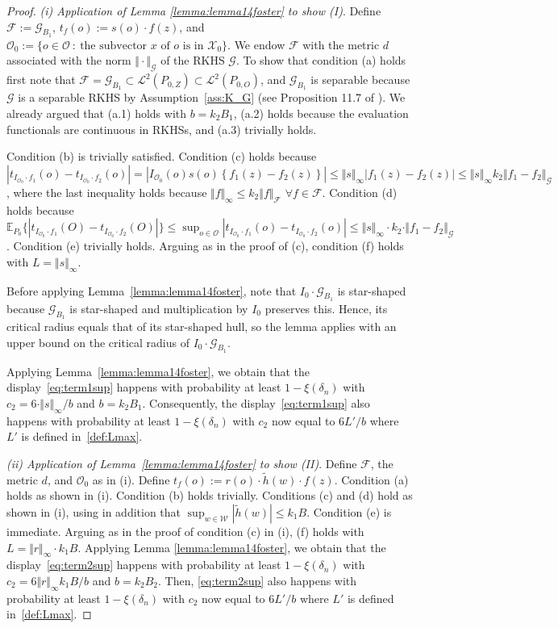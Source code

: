 \documentclass[twoside,11pt]{article}
\newcommand{\E}{\mathbb{E}}
\newcommand{\mc}{\mathcal}
\begin{document}
\begin{proof}
\textit{(i) Application of Lemma \ref{lemma:lemma14foster} to show (I)}. Define $\mc{F}:=\mc{G}_{B_1}$, $t_f(o):=s(o)\cdot f(z)$, and $\mc{O}_0:=\{o\in\mc{O}\: :\:\text{the subvector }x\text{ of }o\text{ is in }\mc{X}_0\}$. We endow $\mc{F}$ with the metric $d$ associated with the norm $\Vert\cdot\Vert_{\mc{G}}$ of the RKHS $\mc{G}$. To show that condition (a) holds first note that $\mc{F}= \mc{G}_{B_1}\subset\mc{L}^2(P_{0,Z})\subset\mc{L}^2(P_{0,O})$, and $\mc{G}_{B_1}$ is separable because $\mc{G}$ is a separable RKHS by Assumption~\ref{ass:K_G} (see Proposition 11.7 of \cite{paulsen2016introduction}). We already argued that (a.1) holds with $b=k_2B_1$, (a.2) holds because the evaluation functionals are continuous in RKHSs, and (a.3) trivially holds.

Condition (b) is trivially satisfied. Condition (c) holds because $ |t_{I_{\mc{O}_0}\cdot f_1}(o)-t_{I_{\mc{O}_0}\cdot f_2}(o)|=|I_{\mc{O}_0}(o)s(o)\left\{f_1(z)-f_2(z)\right\}|\le \Vert s\Vert_\infty |f_1(z)-f_2(z)|\le  \Vert s\Vert_\infty k_2\Vert f_1-f_2\Vert_{\mc{G}}$, where the last inequality holds because $\Vert f\Vert_\infty\le k_2\Vert f\Vert_\mc{F}$ $\forall f\in\mc{F}$. Condition (d) holds because $\E_{P_0}\{|t_{I_{\mc{O}_0}\cdot f_1}(O)-t_{I_{\mc{O}_0}\cdot f_2}(O)|\}\le\sup_{o\in\mc{O}}|t_{I_{\mc{O}_0}\cdot f_1}(o)-t_{I_{\mc{O}_0}\cdot f_2}(o)|\le  \Vert s\Vert_\infty\cdot k_2\cdot \Vert f_1-f_2\Vert_{\mc{G}}$. Condition (e) trivially holds. Arguing as in the proof of (c), condition (f) holds with $L=\Vert s\Vert_{\infty}$.

Before applying Lemma~\ref{lemma:lemma14foster}, note that $I_0\cdot\mc{G}_{B_1}$ is star-shaped because $\mc{G}_{B_1}$ is star-shaped and multiplication by $I_0$ preserves this. Hence, its critical radius equals that of its star-shaped hull, so the lemma applies with an upper bound on the critical radius of $I_0\cdot\mc{G}_{B_1}$.

 Applying Lemma~\ref{lemma:lemma14foster}, we obtain that the display~\eqref{eq:term1sup} happens with probability at least $1-\xi(\delta_n)$ with $c_2=6\cdot \Vert s\Vert_{\infty}/b$ and $b=k_2B_1$. Consequently, the display~\eqref{eq:term1sup} also happens with probability at least $1-\xi(\delta_n)$ with $c_2$ now equal to $6L'/b$ where $L'$ is defined in~\eqref{def:Lmax}.
\smallskip

\textit{(ii) Application of Lemma~\ref{lemma:lemma14foster} to show (II)}. Define $\mc{F}$, the metric $d$, and $\mc{O}_0$ as in (i). Define $t_f(o):=r(o)\cdot \tilde h(w)\cdot f(z)$. Condition (a) holds as shown in (i). Condition (b) holds trivially. Conditions (c) and (d) hold as shown in (i), using in addition that $\sup_{w\in\mc{W}}|\tilde h(w)|\le k_1B$. Condition (e) is immediate. Arguing as in the proof of condition (c) in (i), (f) holds with $L=\Vert r\Vert_{\infty}\cdot k_1B$. Applying Lemma \ref{lemma:lemma14foster}, we obtain that the display~\eqref{eq:term2sup} happens with probability at least $1-\xi(\delta_n)$ with $c_2=6 \Vert r\Vert_{\infty} k_1B/b$ and $b=k_2B_2$. Then, \eqref{eq:term2sup} also happens with probability at least $1-\xi(\delta_n)$ with $c_2$ now equal to $6L'/b$ where $L'$ is defined in~\eqref{def:Lmax}.
\smallskip


\end{proof}
\end{document}
